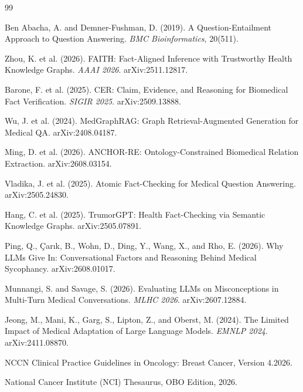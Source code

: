 \documentclass[10pt,a4paper]{article}
\begin{document}
\begin{thebibliography}{99}
\footnotesize
\setlength{\itemsep}{1pt}
\setlength{\parskip}{0pt}

Ben Abacha, A. and Demner-Fushman, D. (2019).
A Question-Entailment Approach to Question Answering.
\textit{BMC Bioinformatics}, 20(511).

Zhou, K. et al. (2026).
FAITH: Fact-Aligned Inference with Trustworthy Health Knowledge Graphs.
\textit{AAAI 2026}. arXiv:2511.12817.

Barone, F. et al. (2025).
CER: Claim, Evidence, and Reasoning for Biomedical Fact Verification.
\textit{SIGIR 2025}. arXiv:2509.13888.

Wu, J. et al. (2024).
MedGraphRAG: Graph Retrieval-Augmented Generation for Medical QA.
arXiv:2408.04187.

Ming, D. et al. (2026).
ANCHOR-RE: Ontology-Constrained Biomedical Relation Extraction.
arXiv:2608.03154.

Vladika, J. et al. (2025).
Atomic Fact-Checking for Medical Question Answering.
arXiv:2505.24830.

Hang, C. et al. (2025).
TrumorGPT: Health Fact-Checking via Semantic Knowledge Graphs.
arXiv:2505.07891.

Ping, Q., \c{C}ar{\i}k, B., Wohn, D., Ding, Y., Wang, X., and Rho, E. (2026).
Why LLMs Give In: Conversational Factors and Reasoning Behind Medical Sycophancy.
arXiv:2608.01017.

Munnangi, S. and Savage, S. (2026).
Evaluating LLMs on Misconceptions in Multi-Turn Medical Conversations.
\textit{MLHC 2026}. arXiv:2607.12884.

Jeong, M., Mani, K., Garg, S., Lipton, Z., and Oberst, M. (2024).
The Limited Impact of Medical Adaptation of Large Language Models.
\textit{EMNLP 2024}. arXiv:2411.08870.

NCCN Clinical Practice Guidelines in Oncology: Breast Cancer, Version 4.2026.

National Cancer Institute (NCI) Thesaurus, OBO Edition, 2026.

\end{thebibliography}
\end{document}
